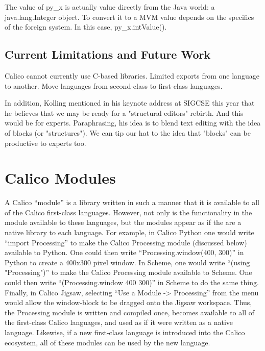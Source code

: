 \documentclass[preprint]{sigplanconf}
\begin{document}
The value of py\_x is actually value directly from the Java world: a
java.lang.Integer object. To convert it to a MVM value depends on the
specifics of the foreign system. In this case, py\_x.intValue().



\subsection{Current Limitations and Future Work}

Calico cannot currently use C-based libraries.
Limited exports from one language to another.
Move languages from second-class to first-class languages.

In addition, Kolling mentioned in his keynote address at SIGCSE this
year that he believes that we may be ready for a "structural editors"
rebirth. And this would be for experts. Paraphrasing, his idea is to
blend text editing with the idea of blocks (or "structures"). We can
tip our hat to the idea that "blocks" can be productive to experts
too.

\section{Calico Modules}

A Calico ``module'' is a library written in such a manner that it is
available to all of the Calico first-class languages. However, not
only is the functionality in the module available to these languages,
but the modules appear as if the are a native library to each
language. For example, in Calico Python one would write ``import
Processing'' to make the Calico Processing module (discussed below)
available to Python. One could then write ``Processing.window(400,
300)'' in Python to create a 400x300 pixel window. In Scheme, one
would write ``(using "Processing")'' to make the Calico Processing
module available to Scheme. One could then write ``(Processing.window
400 300)'' in Scheme to do the same thing. Finally, in Calico Jigsaw,
selecting ``Use a Module -> Processing'' from the menu would allow the
window-block to be dragged onto the Jigsaw workspace. Thus, the
Processing module is written and compiled once, becomes available to
all of the first-class Calico languages, and used as if it were
written as a native language. Likewise, if a new first-class language
is introduced into the Calico ecosystem, all of these modules can be
used by the new language.
\end{document}

